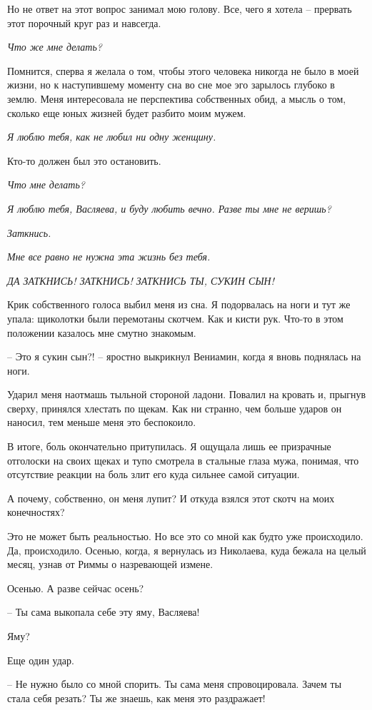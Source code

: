 \documentclass[
]{book}
\begin{document}
Но не ответ на этот вопрос занимал мою голову. Все, чего я хотела -- прервать этот порочный круг раз и навсегда.

\emph{Что же мне делать?}

Помнится, сперва я желала о том, чтобы этого человека никогда не было в моей жизни, но к наступившему моменту сна во сне мое эго зарылось глубоко в землю. Меня интересовала не перспектива собственных обид, а мысль о том, сколько еще юных жизней будет разбито моим мужем.

\emph{Я люблю тебя, как не любил ни одну женщину.}

Кто-то должен был это остановить.

\emph{Что мне делать?}

\emph{Я люблю тебя, Васляева, и буду любить вечно. Разве ты мне не веришь?}

\emph{Заткнись.}

\emph{Мне все равно не нужна эта жизнь без тебя.}

\emph{ДА ЗАТКНИСЬ! ЗАТКНИСЬ! ЗАТКНИСЬ ТЫ, СУКИН СЫН!}

Крик собственного голоса выбил меня из сна. Я подорвалась на ноги и тут же упала: щиколотки были перемотаны скотчем. Как и кисти рук. Что-то в этом положении казалось мне смутно знакомым.

-- Это я сукин сын?! -- яростно выкрикнул Вениамин, когда я вновь поднялась на ноги.

Ударил меня наотмашь тыльной стороной ладони. Повалил на кровать и, прыгнув сверху, принялся хлестать по щекам. Как ни странно, чем больше ударов он наносил, тем меньше меня это беспокоило.

В итоге, боль окончательно притупилась. Я ощущала лишь ее призрачные отголоски на своих щеках и тупо смотрела в стальные глаза мужа, понимая, что отсутствие реакции на боль злит его куда сильнее самой ситуации.

А почему, собственно, он меня лупит? И откуда взялся этот скотч на моих конечностях?

Это не может быть реальностью. Но все это со мной как будто уже происходило. Да, происходило. Осенью, когда, я вернулась из Николаева, куда бежала на целый месяц, узнав от Риммы о назревающей измене.

Осенью. А разве сейчас осень?

-- Ты сама выкопала себе эту яму, Васляева!

Яму?

Еще один удар.

-- Не нужно было со мной спорить. Ты сама меня спровоцировала. Зачем ты стала себя резать? Ты же знаешь, как меня это раздражает!
\end{document}
